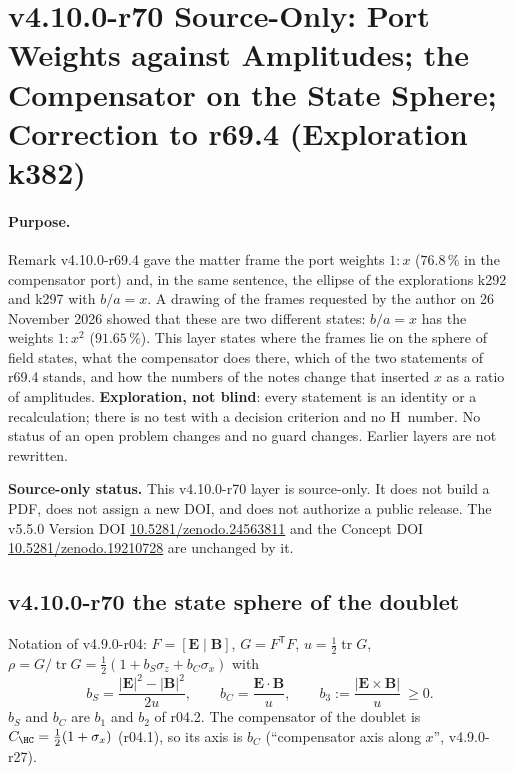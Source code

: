 \clearpage
\section*{v4.10.0-r70 Source-Only: Port Weights against Amplitudes; the Compensator on the State Sphere; Correction to r69.4 (Exploration k382)}
\label{sec:v4100-r70-port-weights}

\paragraph{Purpose.}
Remark v4.10.0-r69.4 gave the matter frame the port weights \(1:x\) (\(76.8\,\%\) in the compensator port) and, in the same sentence, the
ellipse of the explorations k292 and k297 with \(b/a=x\).  A drawing of the frames requested by the author on 26 November 2026 showed that
these are two different states: \(b/a=x\) has the weights \(1:x^2\) (\(91.65\,\%\)).  This layer states where the frames lie on the sphere of
field states, what the compensator does there, which of the two statements of r69.4 stands, and how the numbers of the notes change that
inserted \(x\) as a ratio of amplitudes.  \textbf{Exploration, not blind}: every statement is an identity or a recalculation; there is no test
with a decision criterion and no H~number.  No status of an open problem changes and no guard changes.  Earlier layers are not rewritten.

\noindent\textbf{Source-only status.}
This v4.10.0-r70 layer is source-only.  It does not build a PDF, does not assign a new DOI,
and does not authorize a public release.  The v5.5.0 Version DOI
\href{https://doi.org/10.5281/zenodo.24563811}{10.5281/zenodo.24563811} and the Concept DOI
\href{https://doi.org/10.5281/zenodo.19210728}{10.5281/zenodo.19210728} are unchanged by it.

\subsection*{v4.10.0-r70 the state sphere of the doublet}
\label{subsec:v4100-r70-sphere}

Notation of v4.9.0-r04: \(F=[\mathbf E\mid\mathbf B]\), \(G=F^{\mathsf T}F\), \(u=\tfrac12\operatorname{tr}G\),
\(\rho=G/\operatorname{tr}G=\tfrac12(1+b_S\sigma_z+b_C\sigma_x)\) with
\[
b_S=\frac{|\mathbf E|^2-|\mathbf B|^2}{2u},\qquad b_C=\frac{\mathbf E\cdot\mathbf B}{u},\qquad b_3:=\frac{|\mathbf E\times\mathbf B|}{u}\ \ge0 .
\]
\(b_S\) and \(b_C\) are \(b_1\) and \(b_2\) of r04.2.  The compensator of the doublet is \(C_{\HC}=\tfrac12(1+\sigma_x)\) (r04.1), so its axis is
\(b_C\) (``compensator axis along \(x\)'', v4.9.0-r27).


